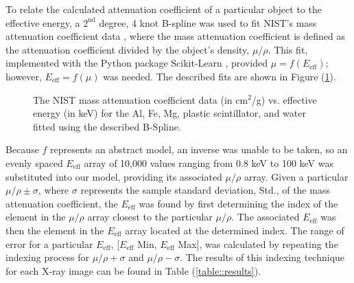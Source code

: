 To relate the calculated attenuation coefficient of a particular object to the effective energy, a $2^\text{nd}$ degree, 4 knot B-spline was used to fit NIST's mass attenuation coefficient data \cite{AttnCoef}, where the mass attenuation coefficient is defined as the attenuation coefficient divided by the object's density, $\mu/\rho$. This fit, implemented with the Python package Scikit-Learn \cite{SKLearn}, provided $\mu = f(E_{\text{eff}})$; however, $E_{\text{eff}} = f(\mu)$ was needed. The described fits are shown in Figure (\ref{figure:NISTSplineFit}).


\begin{figure}[htbp]
    \centering
\end{figure}

\begin{figure}[htbp]
    \addtocounter{subfigure}{2}
    \ContinuedFloat
    \addtocounter{figure}{1}
    \centering
    \caption{The NIST mass attenuation coefficient data (in cm$^2$/g) vs. effective energy (in keV) for the Al, Fe, Mg, plastic scintillator, and water fitted using the described B-Spline.}
    \label{figure:NISTSplineFit}
\end{figure}

\newpage
Because $f$ represents an abstract model, an inverse was unable to be taken, so an evenly spaced $E_{\text{eff}}$ array of 10,000 values ranging from 0.8 keV to 100 keV was substituted into our model, providing its associated $\mu/\rho$ array. Given a particular $\mu/\rho \pm \sigma$, where $\sigma$ represents the sample standard deviation, Std., of the mass attenuation coefficient, the $E_{\text{eff}}$ was found by first determining the index of the element in the $\mu/\rho$ array closest to the particular $\mu/\rho$. The associated $E_{\text{eff}}$ was then the element in the $E_{\text{eff}}$ array located at the determined index. The range of error for a particular $E_{\text{eff}}$, [$E_{\text{eff}}$ Min, $E_{\text{eff}}$ Max], was calculated by repeating the indexing process for $\mu/\rho + \sigma$ and $\mu/\rho - \sigma$. The results of this indexing technique for each X-ray image can be found in Table (\ref{table::results}).


